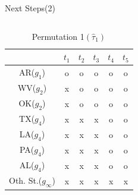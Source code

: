 \documentclass[12pt,  aspectratio=169]{beamer}    %
\begin{document}
\begin{frame}{Next  Steps(2)}
\begin{columns}
    \begin{table}[h]
        \centering
        \tiny
        \begin{tabular}{|c|c|c|c|c|c|}
        \hline
              &$t_1$&$t_2$&$t_3$&$t_4$&$t_5$  \\  \hline
              {\color{blue}AR}($g_1$)&\textcolor{red!60}{o}&\textcolor{red!60}{o}&\textcolor{red!60}{o}&\textcolor{red!60}{o}&\textcolor{red!60}{o}  \\  \hline
              {\color{blue}WV}($g_2$)&x&\textcolor{red!60}{o}&\textcolor{red!60}{o}&\textcolor{red!60}{o}&\textcolor{red!60}{o}  \\  \hline
              OK($g_2$)&x&\textcolor{red!60}{o}&\textcolor{red!60}{o}&\textcolor{red!60}{o}&\textcolor{red!60}{o}  \\  \hline
              {\color{blue}TX}($g_4$)&x&x&x&\textcolor{red!60}{o}&\textcolor{red!60}{o}  \\  \hline
              LA($g_4$)&x&x&x&\textcolor{red!60}{o}&\textcolor{red!60}{o}  \\  \hline
              PA($g_4$)&x&x&x&\textcolor{red!60}{o}&\textcolor{red!60}{o}  \\  \hline
              {\color{blue}AL}($g_4$)&x&x&x&\textcolor{red!60}{o}&\textcolor{red!60}{o}  \\  \hline
              Oth.  St.($g_\infty$)&x&x&x&x&x  \\  \hline
        \end{tabular}
        \caption{\footnotesize  Permutation  1$(\hat\tau_{1})$}
    \end{table}


\end{columns}
\end{frame}
\end{document}
